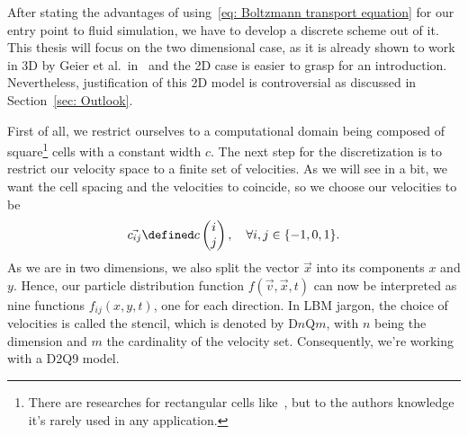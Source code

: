 After stating the advantages of using~\eqref{eq: Boltzmann transport equation} for our entry point to fluid simulation, we have to develop a discrete scheme out of it.
This thesis will focus on the two dimensional case, as it is already shown to work in 3D by Geier et al.\ in~\cite{geier2015cumulant} and the 2D case is easier to grasp for an introduction. Nevertheless, justification of this 2D model is controversial as discussed in Section~\ref{sec: Outlook}.

First of all, we restrict ourselves to a computational domain being composed of square\footnote{There are researches for rectangular cells like~\cite{Bouzidi2001704}, but to the authors knowledge it's rarely used in any application.} cells with a constant width $c$.
The next step for the discretization is to restrict our velocity space to a finite set of velocities. As we will see in a bit, we want the cell spacing and the velocities to coincide, so we choose our velocities to be
\begin{equation}
  \label{eq: definition of the velocities}
  \vec{c_{ij}} \defined c\begin{pmatrix}i \\ j\end{pmatrix}, \quad\forall i,j\in \{-1, 0, 1\}.
\end{equation}
As we are in two dimensions, we also split the vector $\vec{x}$ into its components $x$ and $y$.
Hence, our particle distribution function $f(\vec{v},\vec{x},t)$ can now be interpreted as nine functions $f_{ij}(x,y,t)$, one for each direction.
In LBM jargon, the choice of velocities is called the stencil, which is denoted by D$n$Q$m$, with $n$ being the dimension and $m$ the cardinality of the velocity set. Consequently, we're working with a D2Q9 model.


